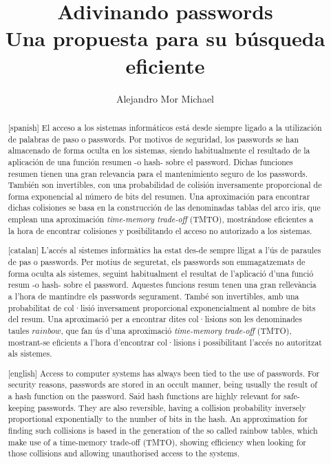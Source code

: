 \documentclass[12pt,spanish,listoffigures,listoftables]{tfgetsinf}
\title{Adivinando passwords \\
         Una propuesta para su búsqueda eficiente}
\author{Alejandro Mor Michael}
\begin{document}
\begin{abstract}[spanish]
El acceso a los sistemas informáticos está desde siempre ligado a la utilización de palabras de paso o passwords. Por motivos de seguridad, los passwords se han almacenado de forma oculta en los sistemas, siendo habitualmente el resultado de la aplicación de una función resumen -o hash- sobre el password. Dichas funciones resumen tienen una gran relevancia para el mantenimiento seguro de los passwords. También son invertibles, con una probabilidad de colisión inversamente proporcional de forma exponencial al número de bits del resumen. Una aproximación para encontrar dichas colisiones se basa en la construcción de las denominadas tablas del arco iris, que emplean una aproximación \textit{time-memory trade-off} (TMTO), mostrándose eficientes a la hora de encontrar colisiones y posibilitando el acceso no autorizado a los sistemas.
\end{abstract}

\begin{abstract}[catalan]
L'accés al sistemes informàtics ha estat des-de sempre lligat a l'ús de paraules de pas o passwords. Per motius de seguretat, els passwords son emmagatzemats de forma oculta als sistemes, seguint habitualment el resultat de l'aplicació d'una funció resum -o hash- sobre el password. Aquestes funcions resum tenen una gran rellevància a l'hora de mantindre els passwords segurament. També son invertibles, amb una probabilitat de col·lisió inversament proporcional exponencialment al nombre de bits del resum. Una aproximació per a encontrar dites col·lisions son les denominades taules $rainbow$, que fan ús d'una aproximació \textit{time-memory trade-off} (TMTO), mostrant-se eficients a l'hora d'encontrar col·lisions i possibilitant l'accés no autoritzat als sistemes.
\end{abstract}

\begin{abstract}[english]
Access to computer systems has always been tied to the use of passwords. For security reasons, passwords are stored in an occult manner, being usually the result of a hash function on the password. Said hash functions are highly relevant for safe-keeping passwords. They are also reversible, having a collision probability inversely proportional exponentially to the number of bits in the hash. An approximation for finding such collisions is based in the generation of the so called rainbow tables, which make use of a time-memory trade-off (TMTO), showing efficiency when looking for those collisions and allowing unauthorised access to the systems.
\end{abstract}
\end{document}
